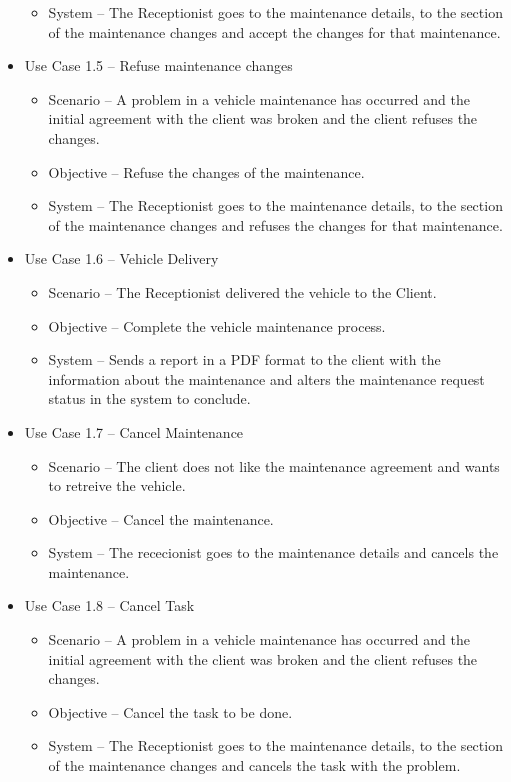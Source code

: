 \begin{itemize}
\begin{itemize}
      \item System – The Receptionist goes to the maintenance details, to the section of the maintenance changes and accept the changes for that maintenance.
    \end{itemize}
    \item Use Case 1.5 – Refuse maintenance changes
    \begin{itemize}
      \item Scenario – A problem in a vehicle maintenance has occurred and the initial agreement with the client was broken and the client refuses the changes.
      \item Objective – Refuse the changes of the maintenance.
      \item System – The Receptionist goes to the maintenance details, to the section of the maintenance changes and refuses the changes for that maintenance.
    \end{itemize}
      \item Use Case 1.6 – Vehicle Delivery 
    \begin{itemize}
      \item Scenario – The Receptionist delivered the vehicle to the Client.
      \item Objective – Complete the vehicle maintenance process.
      \item System – Sends a report in a PDF format to the client with the information about the maintenance and alters the maintenance request status in the system to conclude. 
    \end{itemize}
      \item Use Case 1.7 – Cancel Maintenance 
    \begin{itemize}
      \item Scenario – The client does not like the maintenance agreement and wants to retreive the vehicle.
      \item Objective – Cancel the maintenance.
      \item System – The rececionist goes to the maintenance details and cancels the maintenance. 
    \end{itemize}
    \item Use Case 1.8 – Cancel Task 
    \begin{itemize}
      \item Scenario – A problem in a vehicle maintenance has occurred and the initial agreement with the client was broken and the client refuses the changes.
      \item Objective – Cancel the task to be done.
      \item System – The Receptionist goes to the maintenance details, to the section of the maintenance changes and cancels the task with the problem.
    \end{itemize}
  \end{itemize}  
  \hfill \break


